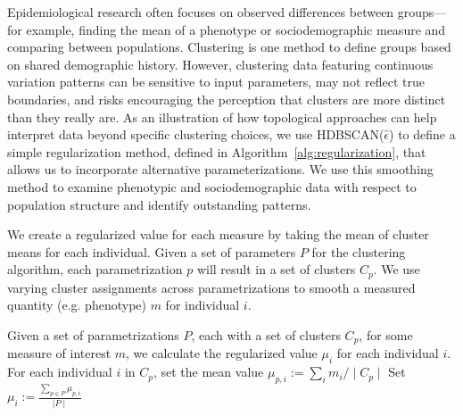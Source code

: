 Epidemiological research often focuses on observed differences between groups---for example, finding the mean of a phenotype or sociodemographic measure and comparing between populations. Clustering is one method to define groups based on shared demographic history. However, clustering data featuring continuous variation patterns can be sensitive to input parameters, may not reflect true boundaries, and risks encouraging the perception that clusters are more distinct than they really are\citep{lewis_getting_2022}. As an illustration of how topological approaches can help interpret data beyond specific clustering choices, we use HDBSCAN($\hat{\epsilon}$) to define a simple regularization method, defined in Algorithm~\ref{alg:regularization}, that allows us to incorporate alternative parameterizations. We use this smoothing method to examine phenotypic and sociodemographic data with respect to population structure and identify outstanding patterns.

\clearpage

\begin{algorithm}
\caption{We create a regularized value for each measure by taking the mean of cluster means for each individual. Given a set of parameters $P$ for the clustering algorithm, each parametrization $p$ will result in a set of clusters $C_p$. We use varying cluster assignments across parametrizations to smooth a measured quantity (e.g. phenotype) $m$ for individual $i$.}
\label{alg:regularization}
\begin{algorithmic}
\State Given a set of parametrizations $P$, each with a set of clusters $C_p$, for some measure of interest $m$, we calculate the regularized value $\mu_i$ for each individual $i$.
\State For each individual $i$ in $C_p$, set the mean value $\mu_{p,i}:=\sum_{i}m_i/\mid C_p \mid $
\EndFor
\EndFor
\State Set $\mu_{i}:=\frac{\sum_{p \in P}\mu_{p,i}}{\mid P \mid}$
\end{algorithmic}
\end{algorithm}

\clearpage

